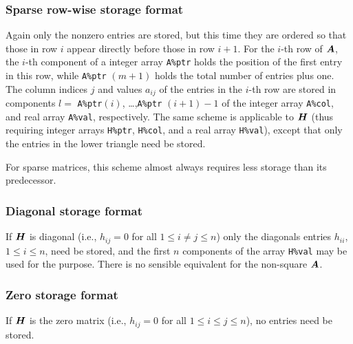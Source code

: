 \documentclass{galahad}
\newcommand{\packagename}{PRESOLVE}
\newcommand{\sym}{\tt\small}
\begin{document}
\subsubsection{Sparse row-wise storage format}\label{rowwise}
Again only the nonzero entries are stored, but this time
they are ordered so that those in row $i$ appear directly before those
in row $i+1$. For the $i$-th row of ${\bm{A}}$, the $i$-th component of a
integer array {\tt A\%ptr} holds the position of the first entry in this row,
while {\tt A\%ptr} $(m+1)$ holds the total number of entries plus one.
The column indices $j$ and values $a_{ij}$ of the entries in the $i$-th row
are stored in components
$l =$ {\tt A\%ptr}$(i)$, \ldots ,{\tt A\%ptr} $(i+1)-1$ of the
integer array {\tt A\%col}, and real array {\tt A\%val}, respectively.
The same scheme is applicable to
${\bm{H}}$ (thus requiring integer arrays {\tt H\%ptr}, {\tt H\%col}, and
a real array {\tt H\%val}),
except that only the entries in the lower triangle need be stored.

For sparse matrices, this scheme almost always requires less storage than
its predecessor.

\subsubsection{Diagonal storage format}\label{diagonal}
If ${\bm{H}}$ is diagonal (i.e., $h_{ij} = 0$ for all $1 \leq i \neq j \leq n$)
only the diagonals entries $h_{ii}$, $1 \leq i \leq n$,  need be stored,
and the first $n$ components of the array {\tt H\%val} may be used for
the purpose. There is no sensible equivalent for the non-square ${\bm{A}}$.

\subsubsection{Zero storage format}\label{zero}
If ${\bm{H}}$ is the zero matrix (i.e., $h_{ij} = 0$ for all 
$1 \leq i \leq j \leq n$), no entries need be stored.



\end{document}
